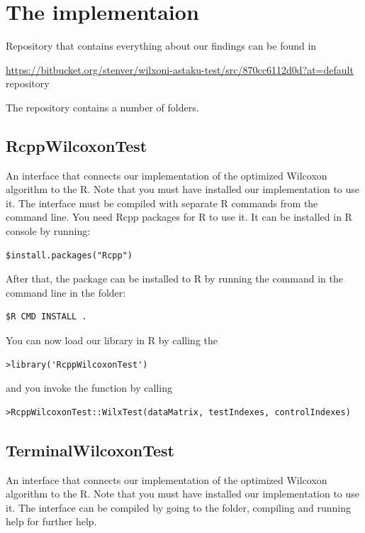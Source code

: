 \documentclass[12pt]{article}
\begin{document}
\newpage

\section{The implementaion}
Repository that contains everything about our findings can be found in

\url{https://bitbucket.org/stenver/wilxoni-astaku-test/src/870cc6112d0d?at=default} repository

The repository contains a number of folders.

\subsection{RcppWilcoxonTest}
 An interface that connects our implementation of the optimized Wilcoxon algorithm to the R. Note that you must have installed our implementation to use it. The interface must be compiled with separate R commands from the command line. You need Rcpp packages for R to use it. It can be installed in R console by running:

\begin{lstlisting}
$install.packages("Rcpp")
\end{lstlisting}

After that, the package can be installed to R by running the command in the command line in the folder:

\begin{lstlisting}
$R CMD INSTALL .
\end{lstlisting}

You can now load our library in R by calling the

\begin{lstlisting}
>library('RcppWilcoxonTest')
\end{lstlisting}

and you invoke the function by calling

\begin{lstlisting}
>RcppWilcoxonTest::WilxTest(dataMatrix, testIndexes, controlIndexes)
\end{lstlisting}

\subsection{TerminalWilcoxonTest}

An interface that connects our implementation of the optimized Wilcoxon algorithm to the R. Note that you must have installed our implementation to use it. The interface can be compiled by going to the folder, compiling and running help for further help.
\end{document}

